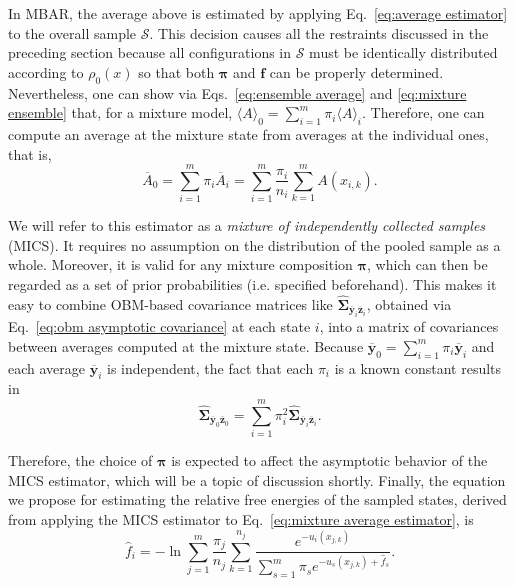 \documentclass[aip,jcp,reprint,amsmath,amssymb]{revtex4-1}
\newcommand{\mt}[1]{\boldsymbol{\mathbf{#1}}}           %
\newcommand{\vt}[1]{\boldsymbol{\mathbf{#1}}}           %
\begin{document}
In MBAR, the average above is estimated by applying Eq.~\eqref{eq:average estimator} to the overall sample $\mathcal S$. This decision causes all the restraints discussed in the preceding section because all configurations in $\mathcal S$ must be identically distributed according to $\rho_0(x)$ so that both $\vt \pi$ and $\vt f$ can be properly determined. Nevertheless, one can show via Eqs.~\eqref{eq:ensemble average} and \eqref{eq:mixture ensemble} that, for a mixture model, $\langle A \rangle_0 = \sum_{i=1}^m \pi_i \langle A \rangle_i$. Therefore, one can compute an average at the mixture state from averages at the individual ones, that is,
\begin{equation}
\label{eq:mixture average estimator}
{\overline A}_0 = \sum_{i=1}^m \pi_i \overline{A}_i = \sum_{i=1}^m \frac{\pi_i}{n_i} \sum_{k=1}^m A(x_{i,k}).
\end{equation}

We will refer to this estimator as a \textit{mixture of independently collected samples} (MICS). It requires no assumption on the distribution of the pooled sample as a whole. Moreover, it is valid for any mixture composition $\vt \pi$, which can then be regarded as a set of prior probabilities (i.e. specified beforehand). This makes it easy to combine OBM-based covariance matrices like $\hat{\mt \Sigma}_{\overline{\vt y}_i \overline{\vt z}_i}$, obtained via Eq.~\eqref{eq:obm asymptotic covariance} at each state $i$, into a matrix of covariances between averages computed at the mixture state. Because $\overline{\vt y}_0 = \sum_{i=1}^m \pi_i \overline{\vt y}_i$ and each average $\overline{\vt y}_i$ is independent, the fact that each $\pi_i$ is a known constant results in
\begin{equation}
\label{eq:mixture variance estimator}
\hat{\mt \Sigma}_{\overline{\vt y}_0 \overline{\vt z}_0} = \sum_{i=1}^m \pi_i^2 \hat{\mt \Sigma}_{\overline{\vt y}_i \overline{\vt z}_i}.
\end{equation}

Therefore, the choice of $\vt \pi$ is expected to affect the asymptotic behavior of the MICS estimator, which will be a topic of discussion shortly. Finally, the equation we propose for estimating the relative free energies of the sampled states, derived from applying the MICS estimator to Eq.~\eqref{eq:mixture average estimator}, is
\begin{equation}
\label{eq:mblock free energy estimator}
{\hat f}_i = -\ln \sum_{j=1}^m \frac{\pi_j}{n_j} \sum_{k=1}^{n_j} \frac{e^{-u_i(x_{j,k})}}{\sum_{s=1}^m \pi_s e^{-u_s(x_{j,k}) + {\hat f}_s}}.
\end{equation}
\end{document}

